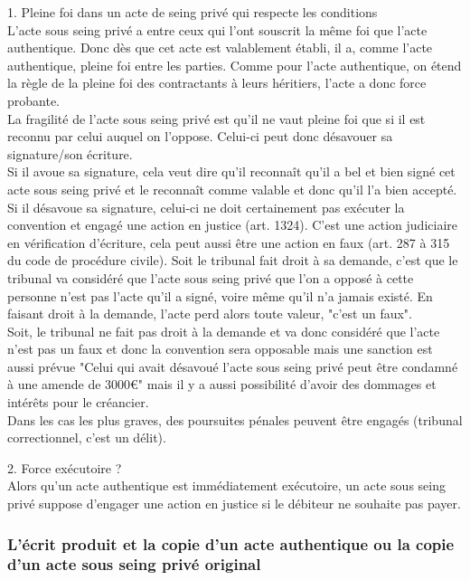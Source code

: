 1. Pleine foi dans un acte de seing privé qui respecte les conditions \\
L'acte sous seing privé a entre ceux qui l'ont souscrit la même foi que l'acte authentique. Donc dès que cet acte est valablement établi, il a, comme l'acte authentique, pleine foi entre les parties. Comme pour l'acte authentique, on étend la règle de la pleine foi des contractants à leurs héritiers, l'acte a donc force probante. \\ 
La fragilité de l'acte sous seing privé est qu'il ne vaut pleine foi que si il est reconnu par celui auquel on l'oppose. Celui-ci peut donc désavouer sa signature/son écriture. \\
Si il avoue sa signature, cela veut dire qu'il reconnaît qu'il a bel et bien signé cet acte sous seing privé et le reconnaît comme valable et donc qu'il l'a bien accepté. \\
Si il désavoue sa signature, celui-ci ne doit certainement pas exécuter la convention et engagé une action en justice (art. 1324). C'est une action judiciaire en vérification d'écriture, cela peut aussi être une action en faux (art. 287 à 315 du code de procédure civile). Soit le tribunal fait droit à sa demande, c'est que le tribunal va considéré que l'acte sous seing privé que l'on a opposé à cette personne n'est pas l'acte qu'il a signé, voire même qu'il n'a jamais existé. En faisant droit à la demande, l'acte perd alors toute valeur, "c'est un faux". \\ 
Soit, le tribunal ne fait pas droit à la demande et va donc considéré que l'acte n'est pas un faux et donc la convention sera opposable mais une sanction est aussi prévue "Celui qui avait désavoué l'acte sous seing privé peut être condamné à une amende de 3000€" mais il y a aussi possibilité d'avoir des dommages et intérêts pour le créancier. \\
Dans les cas les plus graves, des poursuites pénales peuvent être engagés (tribunal correctionnel, c'est un délit).  


2. Force exécutoire ? \\
Alors qu'un acte authentique est immédiatement exécutoire, un acte sous seing privé suppose d'engager une action en justice si le débiteur ne souhaite pas payer. 

\subsubsection{L'écrit produit et la copie d'un acte authentique ou la copie d'un acte sous seing privé original}


